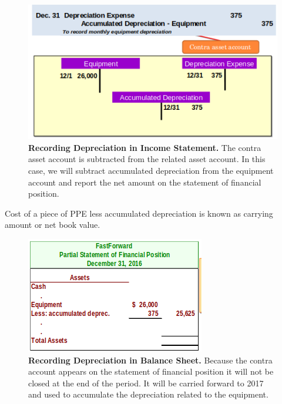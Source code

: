 \documentclass[../main.tex]{subfiles}
\begin{document}
	\begin{figure}[ht!]
		\centering
		\includegraphics[width=1\columnwidth]{images/c3/recording_depreciation.png}
		\caption{\textbf{Recording Depreciation in Income Statement.} The 
		contra asset account is 
		subtracted from the related asset account. In this case, we will 
		subtract accumulated depreciation from the equipment account and report 
		the net amount on the statement of financial position.}	
	\end{figure}
	
	Cost of a piece of PPE less accumulated depreciation is known as carrying 
	amount or net book value.
	
	\begin{figure}[ht]
	\centering
	\includegraphics[width=0.8\columnwidth]{images/c3/recording_depreciation_fp.png}
		\caption{\textbf{Recording Depreciation in Balance Sheet.} Because 
		the contra account appears on the statement of financial position it 
		will not be closed at the end of the period. It will be carried forward 
		to 2017 and used to accumulate the depreciation related to the 
		equipment.}	
	\end{figure}
	
\end{document}
